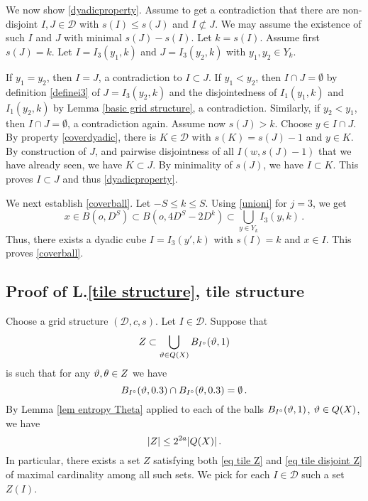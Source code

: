 We now show \eqref{dyadicproperty}. Assume to get a contradiction that
there are non-disjoint $I, J\in \mathcal{D}$ with $s(I)\le s(J)$
and $I \not \subset J$. We may assume the existence of such $I$ and $J$ with minimal
$s(J)-s(I)$. Let $k=s(I)$. Assume first $s(J)=k$. Let $I=I_3(y_1,k)$ and $J=I_3(y_2,k)$ with $y_1,y_2\in Y_k$.
{If $y_1=y_2$, then $I=J$, a contradiction to $I\subset J$.
If $y_1<y_2$, then $I\cap J=\emptyset$ by definition \eqref{definei3} of $J=I_3(y_2, k)$ and the disjointedness of $I_1(y_1, k)$ and $I_1(y_2, k)$ by Lemma \ref{basic grid structure}, a contradiction.
Similarly, if $y_2<y_1$, then $I\cap J=\emptyset$, a contradiction again.
Assume now $s(J)>k$. Choose $y\in I\cap J$. By property \eqref{coverdyadic},
there is $K\in \mathcal{D}$ with $s(K)=s(J)-1$ and $y\in K$. By construction
of $J$, and pairwise disjointness of all $I(w,s(J)-1)$ that we have already seen,
we have $K\subset J$. By minimality of $s(J)$, we have $I\subset K$.
This proves $I\subset J$ and thus \eqref{dyadicproperty}.

We next establish \eqref{coverball}. Let $-S\leq k\leq S$. Using \eqref{unioni} for $j=3$, we get \begin{equation}
x\in B(o, D^S)\subset B(o, 4D^S-2D^k)\subset \bigcup_{y\in Y_k} I_3(y,k)\, .
\end{equation} Thus, there exists a dyadic cube $I=I_3(y', k)$ with $s(I)=k$ and $x\in I$. This proves \eqref{coverball}.


\subsection{Proof of L.\ref{tile structure}, tile structure}
\label{subsectiles}
Choose a grid structure $(\mathcal{D}, c, s)$.
Let $I \in \mathcal{D}$. Suppose that
\begin{equation}
    \label{eq tile Z}
    Z \subset \bigcup_{\vartheta \in {Q}(X)} B_{I^\circ}(\vartheta, 1)
\end{equation}
is such that for any $\vartheta, \theta \in Z$ we have
\begin{equation}
    \label{eq tile disjoint Z}
    B_{I^\circ}(\vartheta, 0.3) \cap B_{I^\circ}(\theta, 0.3) = \emptyset\,.
\end{equation}
By Lemma \ref{lem entropy Theta} applied to each of the balls $B_{I^\circ}(\vartheta, 1)$, $\vartheta \in {Q}(X)$, we have
$$
    |Z| \le 2^{2a} |{Q}(X)|\,.
$$
In particular, there exists a set $Z$ satisfying both \eqref{eq tile Z} and \eqref{eq tile disjoint Z} of maximal cardinality among all such sets. We pick for each $I \in \mathcal{D}$ such a set $Z(I)$.

}
